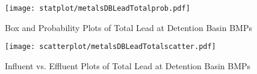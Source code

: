         \begin{figure}[hb]   %
            \centering
            \texttt{[image: statplot/metalsDBLeadTotalprob.pdf]}
            \caption{Box and Probability Plots of Total Lead at Detention Basin BMPs}
        \end{figure}         %
        
        
        \begin{figure}[hb]   %
            \centering
            \texttt{[image: scatterplot/metalsDBLeadTotalscatter.pdf]}
            \caption{Influent vs. Effluent Plots of Total Lead at Detention Basin BMPs}
        \end{figure}         %
        \clearpage
        